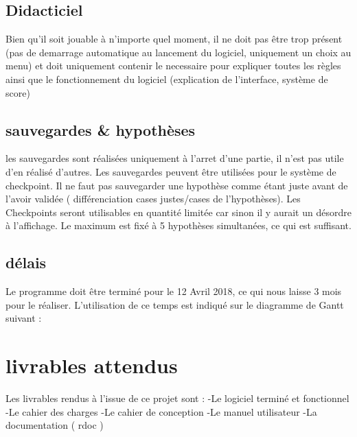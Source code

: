 \documentclass{report}
\begin{document}
	\section{Didacticiel}
		Bien qu'il soit jouable à n'importe quel moment, il ne doit pas être trop présent (pas de demarrage automatique au lancement du logiciel, uniquement un choix au menu) et doit uniquement contenir le necessaire pour expliquer toutes les règles ainsi que le fonctionnement du logiciel (explication de l'interface, système de score)
	
	\section{sauvegardes \& hypothèses}
		les sauvegardes sont réalisées uniquement à l'arret d'une partie, il n'est pas utile d'en réalisé d'autres. Les sauvegardes peuvent être utilisées pour le système de checkpoint. Il ne faut pas sauvegarder une hypothèse comme étant juste avant de l'avoir validée ( différenciation cases justes/cases de l'hypothèses). Les Checkpoints seront utilisables en quantité limitée car sinon il y aurait un désordre à l'affichage. Le maximum est fixé à 5 hypothèses simultanées, ce qui est suffisant.
		
	
	\section{délais}
		Le programme doit être terminé pour le 12 Avril 2018, ce qui nous laisse 3 mois pour le réaliser. L'utilisation de ce temps est indiqué sur le diagramme de Gantt suivant :
		
		
		
\chapter{livrables attendus}
	Les livrables rendus à l'issue de ce projet sont :
		-Le logiciel terminé et fonctionnel
		-Le cahier des charges
		-Le cahier de conception
		-Le manuel utilisateur
		-La documentation ( rdoc )
		
		
\end{document}
